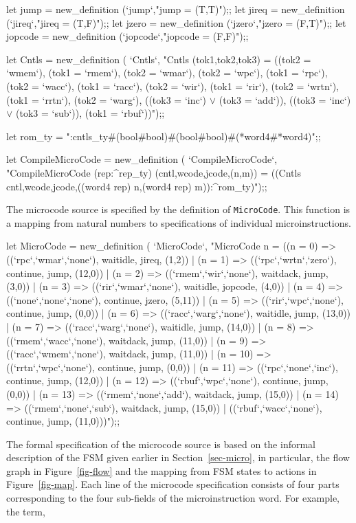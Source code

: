 let jump = new_definition (`jump`,"jump = (T,T)");;
let jireq = new_definition (`jireq`,"jireq = (T,F)");;
let jzero = new_definition (`jzero`,"jzero = (F,T)");;
let jopcode = new_definition (`jopcode`,"jopcode = (F,F)");;

let Cntls = new_definition (
  `Cntls`,
  "Cntls (tok1,tok2,tok3) =
    ((tok2 = `wmem`),
     (tok1 = `rmem`),
     (tok2 = `wmar`),
     (tok2 = `wpc`),
     (tok1 = `rpc`),
     (tok2 = `wacc`),
     (tok1 = `racc`),
     (tok2 = `wir`),
     (tok1 = `rir`),
     (tok2 = `wrtn`),
     (tok1 = `rrtn`),
     (tok2 = `warg`),
     ((tok3 = `inc`) \(\vee\) (tok3 = `add`)),
     ((tok3 = `inc`) \(\vee\) (tok3 = `sub`)),
     (tok1 = `rbuf`))");;

let rom_ty = ":cntls_ty#(bool#bool)#(bool#bool)#(*word4#*word4)";;

let CompileMicroCode = new_definition (
  `CompileMicroCode`,
  "CompileMicroCode (rep:^rep_ty) (cntl,wcode,jcode,(n,m)) =
    ((Cntls cntl,wcode,jcode,((word4 rep) n,(word4 rep) m)):^rom_ty)");;
\endtt

\newpage %

The microcode source is specified by the definition of \verb"MicroCode".
This function is a mapping from natural numbers
to specifications of individual microinstructions.

\begintt
let MicroCode = new_definition (
  `MicroCode`,
  "MicroCode n =
    ((n = 0) => ((`rpc`,`wmar`,`none`), waitidle, jireq, (1,2)) |
     (n = 1) => ((`rpc`,`wrtn`,`zero`), continue, jump, (12,0)) |
     (n = 2) => ((`rmem`,`wir`,`none`), waitdack, jump, (3,0)) |
     (n = 3) => ((`rir`,`wmar`,`none`), waitidle, jopcode, (4,0)) |
     (n = 4) => ((`none`,`none`,`none`), continue, jzero, (5,11)) |
     (n = 5) => ((`rir`,`wpc`,`none`), continue, jump, (0,0)) |
     (n = 6) => ((`racc`,`warg`,`none`), waitidle, jump, (13,0)) |
     (n = 7) => ((`racc`,`warg`,`none`), waitidle, jump, (14,0)) |
     (n = 8) => ((`rmem`,`wacc`,`none`), waitdack, jump, (11,0)) |
     (n = 9) => ((`racc`,`wmem`,`none`), waitdack, jump, (11,0)) |
     (n = 10) => ((`rrtn`,`wpc`,`none`), continue, jump, (0,0)) |
     (n = 11) => ((`rpc`,`none`,`inc`), continue, jump, (12,0)) |
     (n = 12) => ((`rbuf`,`wpc`,`none`), continue, jump, (0,0)) |
     (n = 13) => ((`rmem`,`none`,`add`), waitdack, jump, (15,0)) |
     (n = 14) => ((`rmem`,`none`,`sub`), waitdack, jump, (15,0)) |
                 ((`rbuf`,`wacc`,`none`), continue, jump, (11,0)))");;
\endtt

The formal specification of the microcode source is based on the
informal description of the FSM given earlier in Section~\ref{sec-micro},
in particular, the flow graph in Figure~\ref{fig-flow} and the mapping from
FSM states to actions in Figure~\ref{fig-map}.
Each line of the microcode specification
consists of four parts corresponding
to the four sub-fields of the microinstruction word.
For example,
the term,

